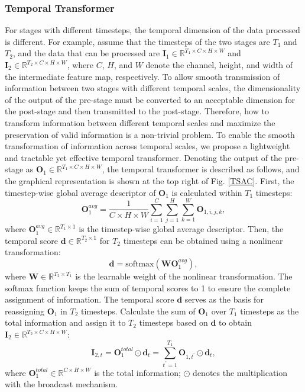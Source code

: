 \documentclass[letterpaper]{article} %
\begin{document}
\subsubsection{Temporal Transformer}
For stages with different timesteps, the temporal dimension of the data processed is different. For example, assume that the timesteps of the two stages are $T_1$ and $T_2$, and the data that can be processed are $\boldsymbol{I}_1 \in \mathbb{R}^{T_1 \times C \times H \times W}$ and $\boldsymbol{I}_2 \in \mathbb{R}^{T_2 \times C \times H \times W}$, where $C$, $H$, and $W$ denote the channel, height, and width of the intermediate feature map, respectively. To allow smooth transmission of information between two stages with different temporal scales, the dimensionality of the output of the pre-stage must be converted to an acceptable dimension for the post-stage and then transmitted to the post-stage. Therefore, how to transform information between different temporal scales and maximize the preservation of valid information is a non-trivial problem. To enable the smooth transformation of information across temporal scales, we propose a lightweight and tractable yet effective temporal transformer. Denoting the output of the pre-stage as $\boldsymbol{O}_1 \in \mathbb{R}^{T_1 \times C \times H \times W}$, the temporal transformer is described as follows, and the graphical representation is shown at the top right of Fig. \ref{TSAC}.
First, the timestep-wise global average descriptor of $\boldsymbol{O}_1$ is calculated within $T_1$ timesteps:
\begin{equation}
\boldsymbol{O}_1^{avg} = \frac {1}{C \times H \times W} \displaystyle \sum_{i=1}^{C} \sum_{j=1}^{H} \sum_{k=1}^{W}\boldsymbol{O}_{1,i,j,k},
\label{eq8}
\end{equation}
where $\boldsymbol{O}_1^{avg} \in \mathbb{R}^{T_1 \times 1}$ is the timestep-wise global average descriptor. Then, the temporal score $\boldsymbol{d} \in \mathbb{R}^{T_2 \times 1}$ for $T_2$ timesteps can be obtained using a nonlinear transformation:
\begin{equation}
\boldsymbol{d} = \text{softmax} (\boldsymbol{W}\boldsymbol{O}_1^{avg}),
\label{eq9}
\end{equation}
where $\boldsymbol{W} \in \mathbb{R}^{T_2 \times T_1}$ is the learnable weight of the nonlinear transformation. The softmax function keeps the sum of temporal scores to 1 to ensure the complete assignment of information. The temporal score $\boldsymbol{d}$ serves as the basis for reassigning $\boldsymbol{O}_1$ in $T_2$ timesteps. Calculate the sum of $\boldsymbol{O}_1$ over $T_1$ timesteps as the total information and
assign it to $T_2$ timesteps based on $\boldsymbol{d}$ to obtain $\boldsymbol{I}_2 \in \mathbb{R}^{T_2 \times C \times H \times W}$:
\begin{equation}
\boldsymbol{I}_{2,t} = \boldsymbol{O}_1^{total} \odot \boldsymbol{d}_t  = \sum_{t^{'}=1}^{T_1}\boldsymbol{O}_{1,t^{'}} \odot \boldsymbol{d}_t,
\label{eq10}
\end{equation}
where $\boldsymbol{O}_1^{total} \in \mathbb{R}^{C \times H \times W}$ is the total information; $\odot$ denotes the multiplication with the broadcast mechanism.
\end{document}
